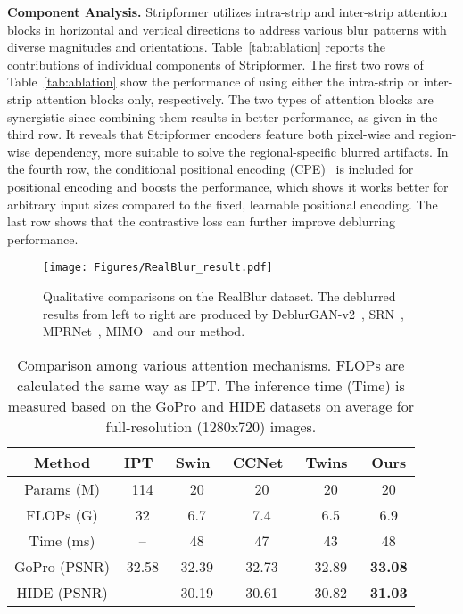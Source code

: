 \noindent\textbf{Component Analysis.} 
Stripformer utilizes intra-strip and inter-strip attention blocks in horizontal and vertical directions to address various blur patterns with diverse magnitudes and orientations.
Table~\ref{tab:ablation} reports the contributions of individual components of Stripformer.
The first two rows of Table~\ref{tab:ablation} show the performance of using either the intra-strip or inter-strip attention blocks only, respectively. 
The two types of attention blocks are synergistic since combining them results in better performance, as given in the third row.
It reveals that Stripformer encoders feature both pixel-wise and region-wise dependency, more suitable to solve the regional-specific blurred artifacts. 
In the fourth row, the conditional positional encoding (CPE)~\cite{chu2021conditional} is included for positional encoding and boosts the performance, which shows it works better for arbitrary input sizes compared to the fixed, learnable positional encoding.  
The last row shows that the contrastive loss can further improve deblurring performance.

\begin{figure*}[t!]
\centering
\texttt{[image: Figures/RealBlur\_result.pdf]}
\caption{Qualitative comparisons on the RealBlur dataset. The deblurred results from left to right are produced by DeblurGAN-v2~\cite{Kupyn_2019_ICCV}, SRN~\cite{tao2018srndeblur}, MPRNet~\cite{Zamir2021MPRNet}, MIMO~\cite{MIMO} and our method.}
\label{fig:Visualization_result_Realblur}
\end{figure*}

\begin{table}[t]
\centering
\setlength{\tabcolsep}{1mm}
\caption{Comparison among various attention mechanisms. FLOPs are calculated the same way as IPT. The inference time (Time) is measured based on the GoPro and HIDE datasets on average for full-resolution (1280x720) images.}
\begin{tabular}{c|ccccc}
\hline
Method &  IPT~\cite{IPT} & Swin~\cite{liu2021Swin} & CCNet~\cite{huang2019ccnet} & Twins~\cite{chu2021Twins} & Ours \\
\hline
Params (M) & 114 &  20   &   20    &   20   &   20   \\
FLOPs (G) &  32 &  6.7   &   7.4  &   6.5   &    6.9  \\
Time (ms) & -- &   48  &   47    &   43   &   48   \\
GoPro (PSNR) & 32.58 &  32.39   &  32.73 &  32.89  &  \bf33.08\\
HIDE (PSNR) & -- &  30.19  & 30.61  & 30.82   &  \bf31.03\\
\hline
\end{tabular}
\label{tab:transformer}
\end{table}


